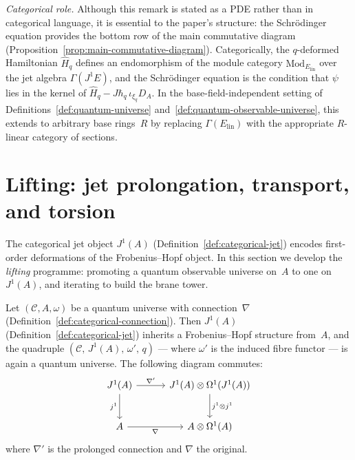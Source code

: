 \begin{remark}
\medskip\noindent\textit{Categorical role.}\;
Although this remark is stated as a PDE rather than in categorical language,
it is essential to the paper's structure: the Schr\"odinger equation
provides the bottom row of the main commutative diagram
(Proposition~\ref{prop:main-commutative-diagram}).  Categorically, the
$q$-deformed Hamiltonian $\hat{H}_q$ defines an endomorphism of the
module category $\mathrm{Mod}_{E_{\mathrm{lin}}}$ over the jet algebra
$\Gamma(J^1 E)$, and the Schr\"odinger equation is the condition that
$\psi$ lies in the kernel of $\hat{H}_q - J\hbar_q\,\iota_{\xi_q}D_A$.
In the base-field-independent setting of
Definitions~\ref{def:quantum-universe}
and~\ref{def:quantum-observable-universe}, this extends to arbitrary base
rings~$R$ by replacing $\Gamma(E_{\mathrm{lin}})$ with the appropriate
$R$-linear category of sections.
\end{remark}

\section{Lifting: jet prolongation, transport, and torsion}
\label{sec:lifting}

The categorical jet object $J^1(A)$ (Definition~\ref{def:categorical-jet})
encodes first-order deformations of the Frobenius--Hopf object.  In this
section we develop the \emph{lifting} programme: promoting a quantum
observable universe on~$A$ to one on $J^1(A)$, and iterating to build
the brane tower.

\begin{proposition}
\label{prop:categorical-jet-prolongation}
\leanok
Let $(\mathcal{C}, A, \omega)$ be a quantum universe with
connection~$\nabla$ (Definition~\ref{def:categorical-connection}).
Then $J^1(A)$ (Definition~\ref{def:categorical-jet}) inherits a
Frobenius--Hopf structure from~$A$, and the quadruple
$(\mathcal{C},\, J^1(A),\, \omega',\, q)$ --- where $\omega'$ is
the induced fibre functor --- is again a quantum universe.
The following diagram commutes:
\begin{equation}\label{eq:jet-prolongation-cd}
\begin{tikzcd}[row sep=2.5em, column sep=3em]
  J^1(A) \ar[r, "\nabla'"] \ar[d, "j^1"']
  & J^1(A) \otimes \Omega^1(J^1(A)) \ar[d, "j^1 \otimes j^1"] \\
  A \ar[r, "\nabla"']
  & A \otimes \Omega^1(A)
\end{tikzcd}
\end{equation}
where $\nabla'$ is the prolonged connection and $\nabla$ the original.
\end{proposition}

